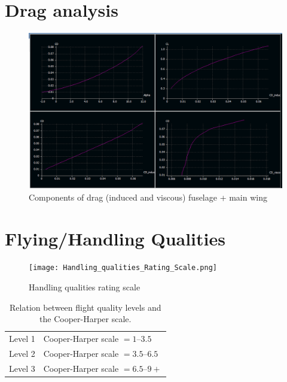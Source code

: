 \documentclass[english,fira]{ist-report}
\begin{document}
\chapter{Drag analysis}
\begin{figure}[!ht]
	\centering
	\includegraphics[width = 1\linewidth]{graphics/aero_simulation_drag_wing_fuselage}
	\caption{Components of drag (induced and viscous) fuselage + main wing}
	\label{fig:drag_wing_fuselage}
\end{figure}

\chapter{Flying/Handling Qualities}

\begin{figure}[!ht]
    \centering
    \texttt{[image: Handling\_qualities\_Rating\_Scale.png]}
    \caption{Handling qualities rating scale}
    \label{fig:Handling qualities rating scale}
\end{figure}


\begin{table}[ht]
    \centering
    \begin{tabular}{c l}\toprule
        Level 1 & Cooper-Harper scale $=1$--$3.5$ \\
        Level 2 & Cooper-Harper scale $=3.5$--$6.5$ \\
        Level 3 & Cooper-Harper scale $=6.5$--$9+$ \\
        \bottomrule
    \end{tabular}
    \caption{Relation between flight quality levels and the Cooper-Harper scale.}
    \label{tab:cooper-harper_scale}
\end{table}

\printbibliography[heading = bibnumbered]
\end{document}
